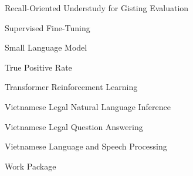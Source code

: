 \begin{abbrv}
	\item[ROUGE] Recall-Oriented Understudy for Gisting Evaluation
	\item[SFT] Supervised Fine-Tuning
	\item[SLM] Small Language Model
	\item[TPR] True Positive Rate
	\item[TRL] Transformer Reinforcement Learning
	\item[ViLegalNLI] Vietnamese Legal Natural Language Inference
	\item[VLQA] Vietnamese Legal Question Answering
	\item[VLSP] Vietnamese Language and Speech Processing
	\item[WP] Work Package
\end{abbrv}


\newpage
{}
\titleformat{\chapter}[hang]{\bfseries\fontsize{16}{19}\selectfont\raggedright}{\MakeUppercase{\chaptername}\ \thechapter}{1ex}{\MakeUppercase}
\titlespacing*{\chapter}{0pt}{20pt}{20pt}
\pagestyle{fancy}